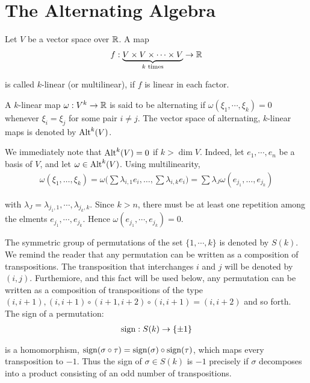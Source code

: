 \chapter{The Alternating Algebra}
Let $V$ be a vector space over $\mathbb{R}$. A map
\begin{align*}
  f: \underbrace{V\times V\times \cdots \times V}_{k\text{ times}} \to \mathbb{R}
\end{align*}

is called $k$-linear (or multilinear), if $f$ is linear in each factor.


\begin{definition}
  A $k$-linear map $\omega: V^k\to\mathbb{R}$ is said to be alternating if
  $\omega(\xi_1, \cdots, \xi_k) = 0$ whenever $\xi_i=\xi_j$ for some pair $i\neq j$. The vector space
  of alternating, $k$-linear maps is denoted by $\operatorname{Alt}^k(V)$.
\end{definition}


We immediately note that $\operatorname{Alt}^k(V) = 0$ if $k > \dim V$. Indeed, let $e_1, \cdots, e_n$ be a
basis of $V$, and let $\omega\in\operatorname{Alt}^k(V)$. Using multilinearity,
\begin{align*}
  \omega(\xi_{1},\ldots,\xi_{k})=\omega\Big(\sum\lambda_{i,1}e_{i},\ldots,\sum\lambda_{i,k}e_{i}\Big)=\sum\lambda_{J}\omega(e_{j_{1}},\ldots,e_{j_{k}})
\end{align*}


with $\lambda_J = \lambda_{j_1, 1}, \cdots, \lambda_{j_k, k}$. Since $k>n$, there must be at least one repetition
among the elments $e_{j_1}, \cdots, e_{j_k}$. Hence $\omega(e_{j_1}, \cdots, e_{j_k}) = 0$.

The symmetric group of permutations of the set $\{1, \cdots,k\}$ is denoted by $S(k)$.
We remind the reader that any permutation can be written as a composition of
transpositions. The transposition that interchanges $i$ and $j$ will be denoted by $(i, j)$.
Furthemiore, and this fact will be used below, any permutation can be written as a
composition of transpositions of the type $(i, i+1), (i, i+1)\circ(i+1, i+2)\circ(i, i+1) =
  (i, i + 2)$ and so forth. The sign of a permutation:
\begin{align}\label{eq:2-1}
  \operatorname{sign}: S(k) \to \{\pm 1\}
\end{align}


is a homomorphism, $\operatorname{sign}(\sigma\circ\tau) = \operatorname{sign}(\sigma)\circ\operatorname{sign}(\tau)$, which maps every
transposition to $-1$. Thus the sign of $\sigma\in S(k)$ is $-1$ precisely if $\sigma$ decomposes into a
product consisting of an odd number of transpositions.

